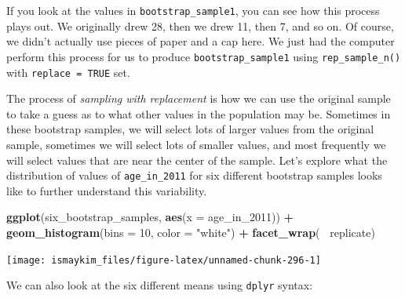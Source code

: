 \documentclass[12pt,]{krantz}
\makeatletter
\newenvironment{Shaded}{\begin{snugshade}}{\end{snugshade}}
\newcommand{\KeywordTok}[1]{\textcolor[rgb]{0.27,0.27,0.27}{\textbf{#1}}}
\newcommand{\DataTypeTok}[1]{\textcolor[rgb]{0.27,0.27,0.27}{#1}}
\newcommand{\DecValTok}[1]{\textcolor[rgb]{0.06,0.06,0.06}{#1}}
\newcommand{\StringTok}[1]{\textcolor[rgb]{0.5,0.5,0.5}{#1}}
\newcommand{\OtherTok}[1]{\textcolor[rgb]{0.37,0.37,0.37}{#1}}
\newcommand{\OperatorTok}[1]{\textcolor[rgb]{0.43,0.43,0.43}{\textbf{#1}}}
\newcommand{\NormalTok}[1]{#1}
\newenvironment{kframe}{%
\medskip{}
\setlength{\fboxsep}{.8em}
 \def\at@end@of@kframe{}%
 \ifinner\ifhmode%
  \def\at@end@of@kframe{\end{minipage}}%
  \begin{minipage}{\columnwidth}%
 \fi\fi%
 \def\FrameCommand##1{\hskip\@totalleftmargin \hskip-\fboxsep
 \colorbox{shadecolor}{##1}\hskip-\fboxsep
     \hskip-\linewidth \hskip-\@totalleftmargin \hskip\columnwidth}%
 \MakeFramed {\advance\hsize-\width
   \@totalleftmargin\z@ \linewidth\hsize
   \@setminipage}}%
 {\par\unskip\endMakeFramed%
 \at@end@of@kframe}
\renewenvironment{Shaded}{\begin{kframe}}{\end{kframe}}
\theoremstyle{definition}
\theoremstyle{definition}
\theoremstyle{definition}
\theoremstyle{remark}
\makeatother
\begin{document}
If you look at the values in \texttt{bootstrap\_sample1}, you can see
how this process plays out. We originally drew 28, then we drew 11, then
7, and so on. Of course, we didn't actually use pieces of paper and a
cap here. We just had the computer perform this process for us to
produce \texttt{bootstrap\_sample1} using \texttt{rep\_sample\_n()} with
\texttt{replace\ =\ TRUE} set.

The process of \emph{sampling with replacement} is how we can use the
original sample to take a guess as to what other values in the
population may be. Sometimes in these bootstrap samples, we will select
lots of larger values from the original sample, sometimes we will select
lots of smaller values, and most frequently we will select values that
are near the center of the sample. Let's explore what the distribution
of values of \texttt{age\_in\_2011} for six different bootstrap samples
looks like to further understand this variability.

\begin{Shaded}
\end{Shaded}

\begin{Shaded}
\begin{Highlighting}[]
\KeywordTok{ggplot}\NormalTok{(six_bootstrap_samples, }\KeywordTok{aes}\NormalTok{(}\DataTypeTok{x =}\NormalTok{ age_in_}\DecValTok{2011}\NormalTok{)) }\OperatorTok{+}
\StringTok{  }\KeywordTok{geom_histogram}\NormalTok{(}\DataTypeTok{bins =} \DecValTok{10}\NormalTok{, }\DataTypeTok{color =} \StringTok{"white"}\NormalTok{) }\OperatorTok{+}
\StringTok{  }\KeywordTok{facet_wrap}\NormalTok{(}\OperatorTok{~}\StringTok{ }\NormalTok{replicate)}
\end{Highlighting}
\end{Shaded}

\begin{center}\texttt{[image: ismaykim\_files/figure-latex/unnamed-chunk-296-1]} \end{center}

We can also look at the six different means using \texttt{dplyr} syntax:
\end{document}

